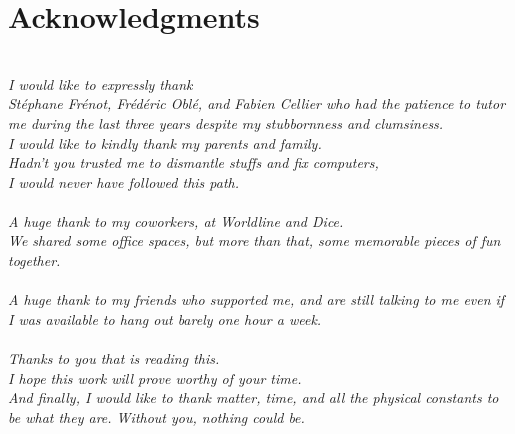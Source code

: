 
\vspace*{\fill}
\section*{Acknowledgments}
\begin{flushleft}
\noindent%
\textit{
~\\
I would like to expressly thank\\
Stéphane Frénot, Frédéric Oblé, and Fabien Cellier who had the patience to tutor me during the last three years despite my stubbornness and clumsiness.
\\[30pt]
%
I would like to kindly thank my parents and family.\\
Hadn't you trusted me to dismantle stuffs and fix computers,\\
I would never have followed this path.\\
{}\\[30pt]
%
A huge thank to my coworkers, at Worldline and Dice.\\
We shared some office spaces, but more than that, some memorable pieces of fun together.\\
{}\\[30pt]
%
A huge thank to my friends who supported me, and are still talking to me even if I was available to hang out barely one hour a week.\\
{}\\[30pt]
%
%
Thanks to you that is reading this.\\
I hope this work will prove worthy of your time.
\\[30pt]
%
And finally, I would like to thank matter, time, and all the physical constants to be what they are.
Without you, nothing could be.
}
\end{flushleft}
\\
\vspace*{\fill}
\eject